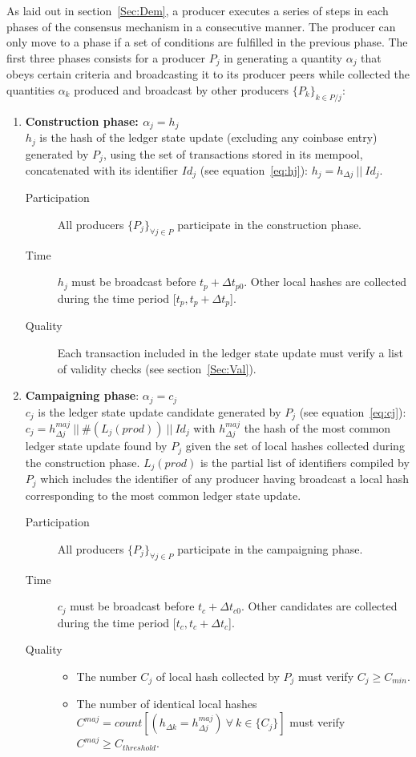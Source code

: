 As laid out in section~\ref{Sec:Dem}, a producer executes a series of steps in each phases of the consensus mechanism in a consecutive manner. The producer can only move to a phase if a set of conditions are fulfilled in the previous phase. The first three phases consists for a producer $P_j$  in generating a quantity $\alpha_j$ that obeys certain criteria and broadcasting it to its producer peers while collected the quantities $\alpha_k$ produced and broadcast by other producers $\{P_k\}_{k\in P/j}$:
\begin{enumerate}
\item \textbf{Construction phase: $\alpha_j = h_j$} \\
 $h_j$ is the hash of the ledger state update (excluding any coinbase entry) generated by $P_j$, using the set of transactions stored in its mempool, concatenated with its identifier $Id_j$ (see equation~\ref{eq:hj}): $h_j = h_{\Delta j}~||~Id_j$. 
\begin{description}
\item[Participation] All producers $\{P_j\}_{\forall j \in P}$ participate in the construction phase. 
\item[Time] $h_j$ must be broadcast before $t_p + \Delta t_{p0}$. Other local hashes are collected during the time period [$t_p, t_p + \Delta t_{p}$].
\item[Quality] Each transaction included in the ledger state update must verify a list of validity checks (see section~\ref{Sec:Val}). 
\end{description}

\item \textbf{Campaigning phase}: $\alpha_j = c_j$\\
$c_j$ is the ledger state update candidate generated by $P_j$ (see equation~\ref{eq:cj}):\\
$c_j = h^{maj}_{\Delta j}~||~\#(L_j(prod))~||~Id_j$ with $h^{maj}_{\Delta j}$ the hash of the most common ledger state update found by $P_j$ given the set of local hashes collected during the construction phase. $L_j(prod)$ is the partial list of identifiers compiled by $P_j$ which includes the identifier of any producer having broadcast a local hash corresponding to the most common ledger state update.
\begin{description}
\item[Participation] All producers $\{P_j\}_{\forall j\in P}$ participate in the campaigning phase. 
\item[Time] $c_j$ must be broadcast before $t_c + \Delta t_{c0}$. Other candidates are collected during the time period [$t_c, t_c + \Delta t_{c}$].
\item[Quality] 
\begin{itemize}
\item The number $C_j$ of local hash collected by $P_j$ must verify $C_j \geq C_{min}$.
\item The number of identical local hashes $C^{maj} = count[(h_{\Delta k} = h^{maj}_{\Delta j})~\forall~k\in\{C_j\}]$ must verify $C^{maj} \geq C_{threshold}$.
\end{itemize}
\end{description}


\end{enumerate}
